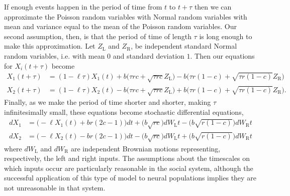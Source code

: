 \documentclass{article}
\begin{document}
If enough events happen in the period of time from $t$ to $t+\tau$ then we can approximate the Poisson random variables with Normal random variables with mean and variance equal to the mean of the Poisson random variables.  Our second assumption, then, is that the period of time of length $\tau$ is long enough to make this approximation. Let $Z_\text{L}$ and $Z_\text{R}$, be independent standard Normal random variables, i.e. with mean $0$ and standard deviation $1$.  Then our equations for $X_i(t+\tau)$ become
\begin{align*}
X_1(t+\tau)&=(1-\ell\tau)X_1(t)+b\bigg(\tau rc+\sqrt{\tau rc}Z_{\text{L}}\bigg)-b\bigg(\tau r(1-c)+\sqrt{\tau r(1-c)}Z_{\text{R}}\bigg)
\\X_2(t+\tau)&=(1-\ell\tau)X_2(t)-b\bigg(\tau rc+\sqrt{\tau rc}Z_{\text{L}}\bigg)+b\bigg(\tau r(1-c)+\sqrt{\tau r(1-c)}Z_{\text{R}}\bigg).
\end{align*}
Finally, as we make the period of time shorter and shorter, making $\tau$ infinitesimally small, these equations become stochastic differential equations,
\begin{equation}
\begin{array}{ll}
dX_1&=\bigg(-\ell X_1(t)+br(2c-1)\bigg)dt+\bigg(b\sqrt{rc}\bigg)dW_\text{L}t-\bigg(b\sqrt{r(1-c)}\bigg)dW_\text{R}t
\\dX_2&=\bigg(-\ell X_2(t)-br(2c-1)\bigg)dt-\bigg(b\sqrt{rc}\bigg)dW_\text{L}t+\bigg(b\sqrt{r(1-c)}\bigg)dW_\text{R}t
\end{array}
\end{equation}
where $dW_{\text{L}}$ and $dW_{\text{R}}$ are independent Brownian motions representing, respectively, the left and right inputs.  The assumptions about the timescales on which inputs occur are particularly reasonable in the social system, although the successful application of this type of model to neural populations implies they are not unreasonable in that system.

\end{document}
